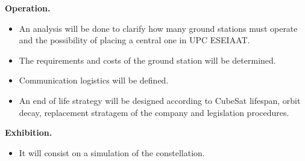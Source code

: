 {\bfseries Operation.} 

\begin{itemize}
	\item An analysis will be done to clarify how many ground stations must operate and the possibility of placing a central one in UPC ESEIAAT.
	\item The requirements and costs of the ground station will be determined. 
	\item Communication logistics will be defined.
	\item An end of life strategy will be designed according to CubeSat lifespan, orbit decay, replacement stratagem of the company and legislation procedures. 
\end{itemize}

{\bfseries Exhibition.}

\begin{itemize}
	\item It will consist on a simulation of the constellation.

\end{itemize}
